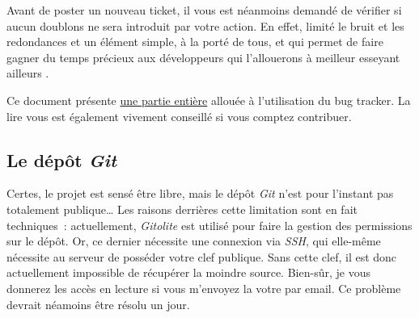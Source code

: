 Avant de poster un nouveau ticket, il vous est néanmoins demandé de vérifier si aucun doublons ne sera introduit par votre action.
En effet, limité le bruit et les redondances et un élément simple, à la porté de tous, et qui permet de faire gagner du temps précieux aux développeurs qui l'allouerons à meilleur esseyant ailleurs \smiley.

Ce document présente \hyperref[sec:contribution_bt]{une partie entière} allouée à l'utilisation du bug tracker.
La lire vous est également vivement conseillé si vous comptez contribuer.

\subsection{Le dépôt \emph{Git}}
Certes, le projet est sensé être libre, mais le dépôt \emph{Git} n'est pour l'instant pas totalement publique\dots{}
Les raisons derrières cette limitation sont en fait techniques~: actuellement, \emph{Gitolite} est utilisé pour faire la gestion des permissions sur le dépôt.
Or, ce dernier nécessite une connexion via \emph{SSH}, qui elle-même nécessite au serveur de posséder votre clef publique.
Sans cette clef, il est donc actuellement impossible de récupérer la moindre source.
Bien-sûr, je vous donnerez les accès en lecture si vous m'envoyez la votre par email.
Ce problème devrait néamoins être résolu un jour.
